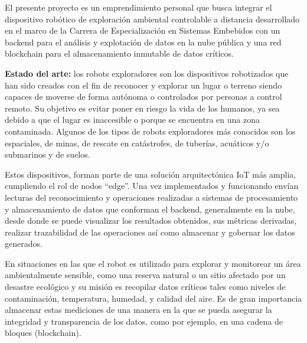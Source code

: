 \documentclass[
11pt, %
]{charter}
\begin{document}
El presente proyecto es un emprendimiento personal que busca integrar el dispositivo robótico de exploración ambiental controlable a distancia desarrollado en el marco de la Carrera de Especialización en Sistemas Embebidos con un backend para el análisis y explotación de datos en la nube pública y una red blockchain para el almacenamiento inmutable de datos críticos.

\textbf{Estado del arte:}
los robots exploradores son los dispositivos robotizados que han sido creados con el fin de reconocer y explorar un lugar o terreno siendo capaces de moverse de forma autónoma o controlados por personas a control remoto. Su objetivo es evitar poner en riesgo la vida de los humanos, ya sea debido a que el lugar es inaccesible o porque se encuentra en una zona contaminada.
Algunos de los tipos de robots exploradores más conocidos son los espaciales, de minas, de rescate en catástrofes, de tuberías, acuáticos y/o submarinos y de suelos.

Estos dispositivos, forman parte de una solución arquitectónica IoT más amplia, cumpliendo el rol de nodos “edge”.  Una vez implementados y funcionando envían lecturas del reconocimiento y operaciones realizadas a sistemas de procesamiento y almacenamiento de datos que conforman el backend, generalmente en la nube, desde donde se puede visualizar los resultados obtenidos, sus métricas derivadas, realizar trazabilidad de las operaciones así como almacenar y gobernar los datos generados.

En situaciones en las que el robot es utilizado para explorar y monitorear un área ambientalmente sensible, como una reserva natural o un sitio afectado por un desastre ecológico y su misión es recopilar datos críticos tales como niveles de contaminación, temperatura, humedad, y calidad del aire. Es de gran importancia almacenar estas mediciones de una manera en la que se pueda asegurar la integridad y transparencia de los datos, como por ejemplo, en una cadena de bloques (blockchain).
\end{document}
